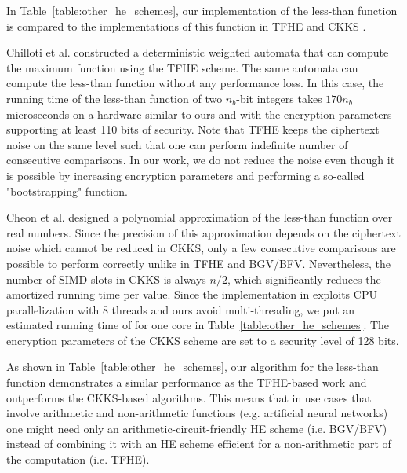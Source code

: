     In Table~\ref{table:other_he_schemes}, our implementation of the less-than function is compared to the implementations of this function in TFHE \cite{AC:CGGI17} and CKKS \cite{EPRINT:CheKimKim19}.

    Chilloti et al. \cite{AC:CGGI17} constructed a deterministic weighted automata that can compute the maximum function using the TFHE scheme.
    The same automata can compute the less-than function without any performance loss. 
    In this case, the running time of the less-than function of two $n_b$-bit integers takes $170 n_b$ microseconds on a hardware similar to ours and with the encryption parameters supporting at least 110 bits of security.
    Note that TFHE keeps the ciphertext noise on the same level such that one can perform indefinite number of consecutive comparisons.
    In our work, we do not reduce the noise even though it is possible by increasing encryption parameters and performing a so-called "bootstrapping" function.

    Cheon et al. \cite{EPRINT:CheKimKim19} designed a polynomial approximation of the less-than function over real numbers.
    Since the precision of this approximation depends on the ciphertext noise which cannot be reduced in CKKS, only a few consecutive comparisons are possible to perform correctly unlike in TFHE and BGV/BFV.
    Nevertheless, the number of SIMD slots in CKKS is always $n/2$, which significantly reduces the amortized running time per value.
    Since the implementation in \cite{EPRINT:CheKimKim19} exploits CPU parallelization with 8 threads and ours avoid multi-threading, we put an estimated running time of \cite{EPRINT:CheKimKim19} for one core in Table~\ref{table:other_he_schemes}.
    The encryption parameters of the CKKS scheme are set to a security level of 128 bits.
    
    As shown in Table~\ref{table:other_he_schemes}, our algorithm for the less-than function demonstrates a similar performance as the TFHE-based work and outperforms the CKKS-based algorithms.
    This means that in use cases that involve arithmetic and non-arithmetic functions (e.g. artificial neural networks) one might need only an arithmetic-circuit-friendly HE scheme (i.e. BGV/BFV) instead of combining it with an HE scheme efficient for a non-arithmetic part of the computation (i.e. TFHE).


